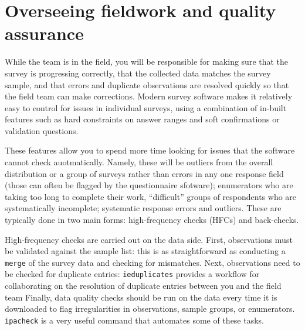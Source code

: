 
\section{Overseeing fieldwork and quality assurance}

While the team is in the field, you will be responsible
for making sure that the survey is progressing correctly,
that the collected data matches the survey sample,
and that errors and duplicate observations are resolved
quickly so that the field team can make corrections.
Modern survey software makes it relatively easy
to control for issues in individual surveys,
using a combination of in-built features
such as hard constraints on answer ranges
and soft confirmations or validation questions.

These features allow you to spend more time
looking for issues that the software cannot check auotmatically.
Namely, these will be outliers from the overall distribution
or a group of surveys rather than errors in any one response field
(those can often be flagged by the questionnaire sfotware);
enumerators who are taking too long to complete their work,
``difficult'' groups of respondents who are systematically incomplete;
systematic response errors and outliers.
These are typically done in two main forms:
high-frequency checks (HFCs) and back-checks.

High-frequency checks are carried out on the data side.
First, observations must be validated against the sample list:
this is as straightforward as conducting a \texttt{merge}
of the survey data and checking for mismatches.
Next, observations need to be checked for duplicate entries:
\texttt{ieduplicates}
provides a workflow for collaborating on the resolution of
duplicate entries between you and the field team
Finally, data quality checks
should be run on the data every time it is downloaded
to flag irregularities in observations, sample groups, or enumerators.
\texttt{ipacheck} is a very useful command that automates some of these tasks.

